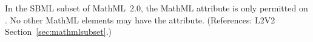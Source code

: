 In the SBML subset of MathML~2.0, the MathML attribute
 is only permitted on .  No other
MathML elements may have the  attribute.
(References: L2V2 Section~\ref{sec:mathmlsubset}.)
